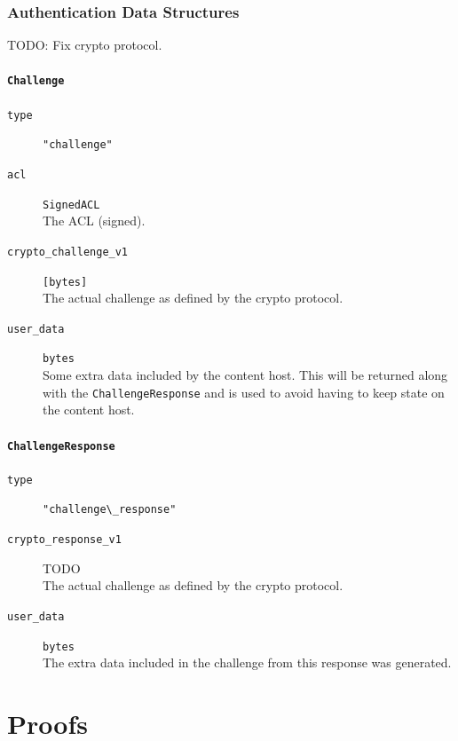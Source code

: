 \documentclass[pdftex,12pt,a4papaer,twoside,notitlepage]{report}
\begin{document}
\subsection{Authentication Data Structures}

TODO: Fix crypto protocol.

\subsubsection{\texttt{Challenge}}

\begin{leftbar}
\begin{description}
\item[\texttt{type}] \verb="challenge"=
\item[\texttt{acl}] \texttt{SignedACL} \\
  The ACL (signed).
\item[\texttt{crypto\_challenge\_v1}] \verb=[bytes]= \\
  The actual challenge as defined by the crypto protocol.
\item[\texttt{user\_data}] \verb=bytes= \\
  Some extra data included by the content host. This will be returned along with
  the \texttt{ChallengeResponse} and is used to avoid having to keep state on
  the content host.
\end{description}
\end{leftbar}

\subsubsection{\texttt{ChallengeResponse}}
\label{struct:challenge_response}

\begin{leftbar}
\begin{description}
\item[\texttt{type}] \verb="challenge\_response"=
\item[\texttt{crypto\_response\_v1}] TODO \\ 
  The actual challenge as defined by the crypto protocol.
\item[\texttt{user\_data}] \verb=bytes= \\
  The extra data included in the challenge from this response was generated.
\end{description}
\end{leftbar}

\chapter{Proofs}
\end{document}
